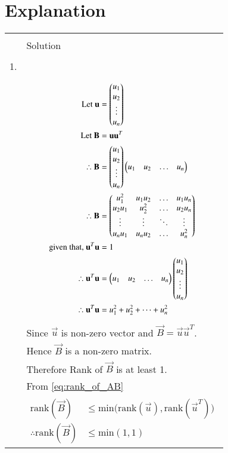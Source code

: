 \documentclass[journal,12pt]{IEEEtran}
\begin{document}
\newpage
\section{\textbf{Explanation}}
\renewcommand{\thetable}{2}
\begin{longtable}{|l|l|}
\hline
\multirow{3}{*}{} & \\
Statement&Solution\\
\hline
&\\
1.&\\
&\parbox{10cm}{\begin{align*}
    \mbox{Let }\mathbf{u}&=\begin{pmatrix}u_1\\u_2\\\vdots\\u_n\end{pmatrix}\\
    \mbox{Let }\mathbf{B}&=\mathbf{u}\mathbf{u}^T\\
    \therefore \mathbf{B}&=\begin{pmatrix}u_1\\u_2\\\vdots\\u_n\end{pmatrix}\begin{pmatrix}u_1&u_2&\dots&u_n\end{pmatrix}\\
    \therefore \mathbf{B}&=\begin{pmatrix}u_1^2&u_1u_2&\dots&u_1u_n\\
    u_2u_1&u_2^2&\dots&u_2u_n\\
    \vdots&\vdots&\ddots&\vdots\\
    u_nu_1&u_nu_2&\dots&u_n^2\end{pmatrix}\\
    \mbox{given that, }\mathbf{u}^T\mathbf{u}&=1\\
    \therefore \mathbf{u}^T\mathbf{u}&=\begin{pmatrix}u_1&u_2&\dots&u_n\end{pmatrix}\begin{pmatrix}u_1\\u_2\\\vdots\\u_n\end{pmatrix}\\
    \therefore \mathbf{u}^T\mathbf{u}&=u_1^2+u_2^2+\dots+u_n^2
\end{align*}}\\
&Since $\vec{u}$ is non-zero vector and $\vec{B}=\vec{u}\vec{u}^T$.\\
&Hence $\vec{B}$ is a non-zero matrix.\\
&Therefore Rank of $\vec{B}$ is at least 1.\\
&From \eqref{eq:rank_of_AB}\\
&\parbox{8cm}{\begin{align*}
    \mbox{rank}(\vec{B})&\leq\mbox{min(rank}(\vec{u}),\mbox{rank}(\vec{u}^T))\\
    \therefore\mbox{rank}(\vec{B})&\leq\mbox{min}(1,1)
\end{align*}}\\

\end{longtable}
\end{document}
